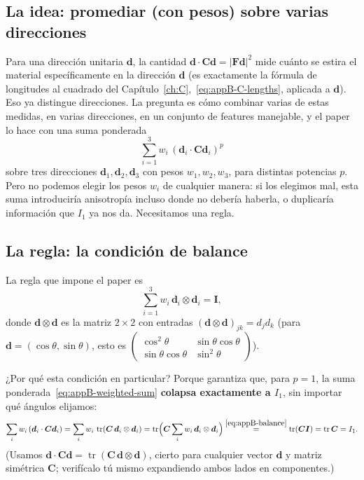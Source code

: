\documentclass[11pt,a4paper]{article}
\newcommand{\tr}{\operatorname{tr}}
\begin{document}
\subsection{La idea: promediar (con pesos) sobre varias direcciones}

Para una direcci\'on unitaria $\bm d$, la cantidad
$\bm d\cdot\bm C\bm d=|\bm F\bm d|^2$ mide cu\'anto se estira el
material espec\'ificamente en la direcci\'on $\bm d$ (es exactamente
la f\'ormula de longitudes al cuadrado del
Cap\'itulo~\ref{ch:C},~\eqref{eq:appB-C-lengths}, aplicada a $\bm d$).
Eso ya distingue direcciones. La pregunta es c\'omo combinar varias de
estas medidas, en varias direcciones, en un conjunto de features
manejable, y el paper lo hace con una suma ponderada
\begin{equation}
 \sum_{i=1}^3 w_i\,(\bm d_i\cdot\bm C\bm d_i)^p
 \label{eq:appB-weighted-sum}
\end{equation}
sobre tres direcciones $\bm d_1,\bm d_2,\bm d_3$ con pesos
$w_1,w_2,w_3$, para distintas potencias $p$. Pero no podemos elegir
los pesos $w_i$ de cualquier manera: si los elegimos mal, esta suma
introducir\'ia anisotrop\'ia incluso donde no deber\'ia haberla, o
duplicar\'ia informaci\'on que $I_1$ ya nos da. Necesitamos una regla.

\subsection{La regla: la condici\'on de balance}

La regla que impone el paper es
\begin{equation}
 \sum_{i=1}^3 w_i\,\bm d_i\otimes\bm d_i=\bm I,
 \label{eq:appB-balance}
\end{equation}
donde $\bm d\otimes\bm d$ es la matriz $2\times2$ con entradas
$(\bm d\otimes\bm d)_{jk}=d_jd_k$ (para $\bm d=(\cos\theta,\sin\theta)$,
esto es $\begin{pmatrix}\cos^2\theta&\sin\theta\cos\theta\\
\sin\theta\cos\theta&\sin^2\theta\end{pmatrix}$).

¿Por qu\'e esta condici\'on en particular? Porque garantiza que, para
$p=1$, la suma ponderada~\eqref{eq:appB-weighted-sum} \textbf{colapsa
exactamente a $I_1$}, sin importar qu\'e \'angulos elijamos:
\[
 \sum_i w_i\,(\bm d_i\cdot\bm C\bm d_i)
 =\sum_i w_i\,\tr(\bm C\,\bm d_i\otimes\bm d_i)
 =\tr\!\Big(\bm C\sum_i w_i\,\bm d_i\otimes\bm d_i\Big)
 \overset{\eqref{eq:appB-balance}}{=}\tr(\bm C\bm I)=\tr\bm C=I_1.
\]
(Usamos $\bm d\cdot\bm C\bm d=\tr(\bm C\,\bm d\otimes\bm d)$, cierto
para cualquier vector $\bm d$ y matriz sim\'etrica $\bm C$; verif\'icalo
t\'u mismo expandiendo ambos lados en componentes.)
\end{document}
